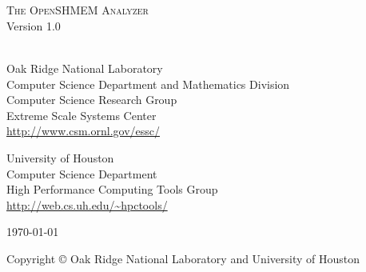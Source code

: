 \begin{titlepage}
  \begin{center}

    \vspace{1.0in} ~ \\

    \HRule \\[0.1in]
    {\LARGE \textsc{The OpenSHMEM Analyzer}} \\
    \vspace{0.2in}
    {\LARGE Version 1.0} \\
    \HRule \\[0.5in]

    \vspace{0.5in}

    Oak Ridge National Laboratory \\
    Computer Science Department and Mathematics Division \\
    Computer Science Research Group \\
    Extreme Scale Systems Center \\
    \vspace{0.1in}
    \url{http://www.csm.ornl.gov/essc/}

    \vspace{0.4in}

    University of Houston \\
    Computer Science Department \\
    High Performance Computing Tools Group \\
    \vspace{0.1in}
    \url{http://web.cs.uh.edu/~hpctools/}

    \vspace{1.0in}

    \today

    \vspace{1.0in}

    Copyright \copyright{} \the\year{} Oak Ridge National Laboratory and University of Houston

  \end{center}
\end{titlepage}
